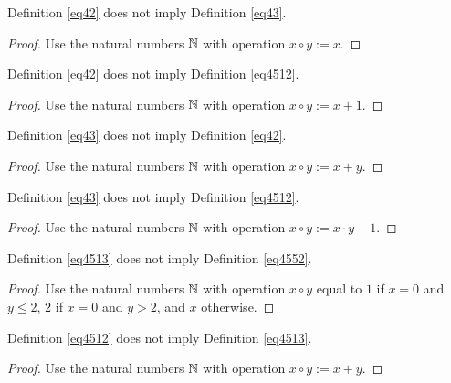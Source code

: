 \begin{theorem}\label{42_not_imply_43} Definition \ref{eq42} does not imply Definition \ref{eq43}.
\end{theorem}

\begin{proof} Use the natural numbers $\mathbb{N}$ with operation $x \circ y := x$.
\end{proof}

\begin{theorem}\label{42_not_imply_4512} Definition \ref{eq42} does not imply Definition \ref{eq4512}.
\end{theorem}

\begin{proof} Use the natural numbers $\mathbb{N}$ with operation $x \circ y := x+1$.
\end{proof}

\begin{theorem}\label{43_not_imply_42} Definition \ref{eq43} does not imply Definition \ref{eq42}.
\end{theorem}

\begin{proof} Use the natural numbers $\mathbb{N}$ with operation $x \circ y := x+y$.
\end{proof}

\begin{theorem}\label{43_not_imply_4512} Definition \ref{eq43} does not imply Definition \ref{eq4512}.
\end{theorem}

\begin{proof} Use the natural numbers $\mathbb{N}$ with operation $x \circ y := x \cdot y + 1$.
\end{proof}

\begin{theorem}\label{4513_not_imply_4552} Definition \ref{eq4513} does not imply Definition \ref{eq4552}.
\end{theorem}

\begin{proof} Use the natural numbers $\mathbb{N}$ with operation $x \circ y$ equal to $1$ if $x=0$ and $y \leq 2$, $2$ if $x=0$ and $y>2$, and $x$ otherwise.
\end{proof}

\begin{theorem}\label{4512_not_imply_4513} Definition \ref{eq4512} does not imply Definition \ref{eq4513}.
\end{theorem}

\begin{proof} Use the natural numbers $\mathbb{N}$ with operation $x \circ y := x + y$.
\end{proof}

